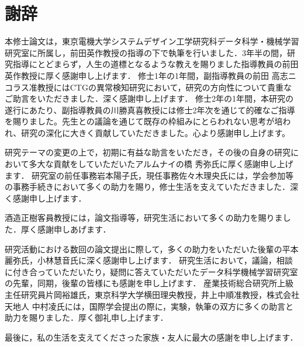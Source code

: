 \chapter*{謝辞}
本修士論文は，東京電機大学システムデザイン工学研究科データ科学・機械学習研究室に所属し，前田英作教授の指導の下で執筆を行いました．3年半の間，研究指導にとどまらず，人生の道標となるような教えを賜りました指導教員の前田英作教授に厚く感謝申し上げます．
修士1年の1年間，副指導教員の前田 高志ニコラス准教授にはCTGの異常検知研究において，研究の方向性について貴重なご助言をいただきました．深く感謝申し上げます．
修士2年の1年間，本研究の遂行にあたり、副指導教員の川勝真喜教授には修士2年次を通じて的確なご指導を賜りました。先生との議論を通じて既存の枠組みにとらわれない思考が培われ、研究の深化に大きく貢献していただきました。心より感謝申し上げます。

研究テーマの変更の上で，初期に有益な助言をいただき，その後の自身の研究において多大な貢献をしていただいたアルムナイの橋 秀弥氏に厚く感謝申し上げます．
研究室の前任事務岩本陽子氏，現任事務佐々木理央氏には，学会参加等の事務手続きにおいて多くの助力を賜り，修士生活を支えていただきました．深く感謝申し上げます．

酒造正樹客員教授には，論文指導等，研究生活において多くの助力を賜りました．厚く感謝申しあげます．

研究活動における数回の論文提出に際して，多くの助力をいただいた後輩の平本麗弥氏，小林慧音氏に深く感謝申し上げます．
研究生活において，議論，相談に付き合っていただいたり，疑問に答えていただいたデータ科学機械学習研究室の先輩，同期，後輩の皆様にも感謝を申し上げます．
産業技術総合研究所上級主任研究員片岡裕雄氏，東京科学大学横田理央教授，井上中順准教授，株式会社天地人 中村凌氏には，国際学会提出の際に，実験，執筆の双方に多くの助言と助力を賜りました．厚く御礼申し上げます．

最後に，私の生活を支えてくださった家族・友人に最大の感謝を申し上げます．

\newpage
